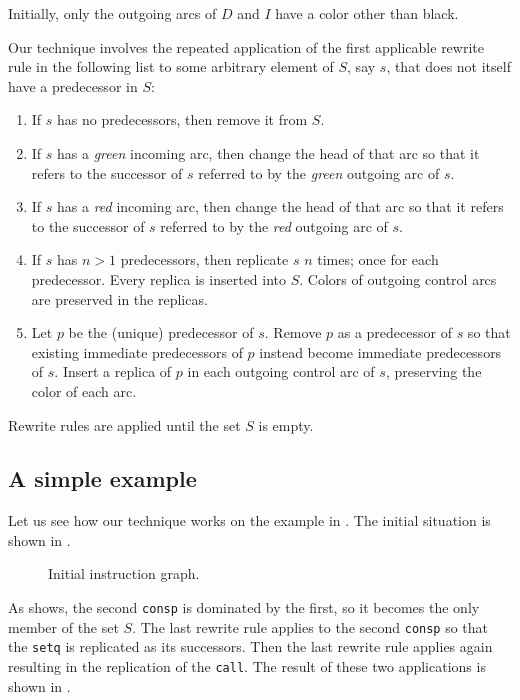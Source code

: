 Initially, only the outgoing arcs of $D$ and $I$ have a color
other than black.

Our technique involves the repeated application of the first
applicable rewrite rule in the following list to some arbitrary
element of $S$, say $s$, that does not itself have a predecessor in
$S$:

\begin{enumerate}
\item If $s$ has no predecessors, then remove it from $S$.
\item If $s$ has a \emph{green} incoming arc, then change the head
  of that arc so that it refers to the successor of $s$ referred to
  by the \emph{green} outgoing arc of $s$.
\item If $s$ has a \emph{red} incoming arc, then change the head
  of that arc so that it refers to the successor of $s$ referred to
  by the \emph{red} outgoing arc of $s$.
\item If $s$ has $n>1$ predecessors, then replicate $s$ $n$ times;
  once for each predecessor.  Every replica is inserted into $S$.
  Colors of outgoing control arcs are preserved in the replicas.
\item Let $p$ be the (unique) predecessor of $s$.  Remove $p$ as a
  predecessor of $s$ so that existing immediate predecessors of $p$
  instead become immediate predecessors of $s$.  Insert a replica of
  $p$ in each outgoing control arc of $s$, preserving the color of
  each arc.
\end{enumerate}

\noindent
Rewrite rules are applied until the set $S$ is empty.

\subsection{A simple example}

Let us see how our technique works on the example in
.  The initial situation is shown in
.

\begin{figure}
\begin{center}
\end{center}
\caption{\label{fig-rewrite-1}
Initial instruction graph.}
\end{figure}

As  shows, the second \texttt{consp} is
dominated by the first, so it becomes the only member of the set $S$.
The last rewrite rule applies to the second \texttt{consp} so that the
\texttt{setq} is replicated as its successors.  Then the last rewrite
rule applies again resulting in the replication of the \texttt{call}.
The result of these two applications is shown in .

